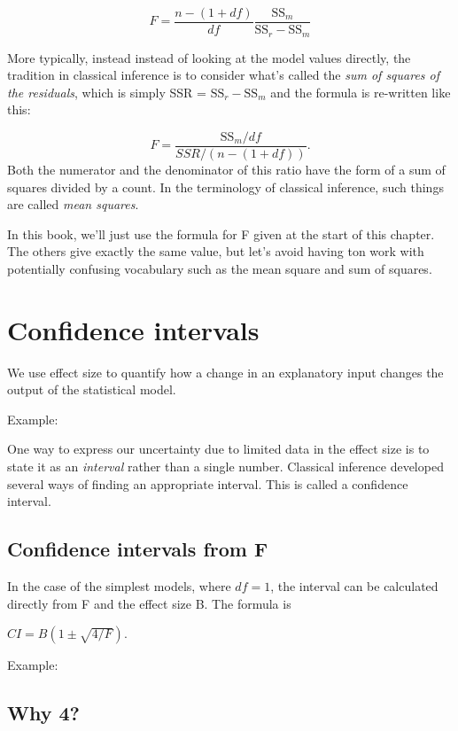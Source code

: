 \documentclass[]{tufte-book}
\begin{document}
\[F = \frac{n - (1+df)}{df} \frac{\mbox{SS}_m}{\mbox{SS}_r - \mbox{SS}_m}\]

More typically, instead instead of looking at the model values directly, the tradition in classical inference is to consider what's called the \emph{sum of squares of the residuals}, which is simply SSR = \(\mbox{SS}_r - \mbox{SS}_m\) and the formula is re-written like this:

\[F = \frac{\mbox{SS}_m / df}{SSR / (n -  (1+df))}.\]
Both the numerator and the denominator of this ratio have the form of a sum of squares divided by a count. In the terminology of classical inference, such things are called \emph{mean squares}.

In this book, we'll just use the formula for F given at the start of this chapter. The others give exactly the same value, but let's avoid having ton work with potentially confusing vocabulary such as the mean square and sum of squares.

\hypertarget{confidence-intervals}{%
\chapter{Confidence intervals}\label{confidence-intervals}}

We use effect size to quantify how a change in an explanatory input changes the output of the statistical model.

Example:

One way to express our uncertainty due to limited data in the effect size is to state it as an \emph{interval} rather than a single number. Classical inference developed several ways of finding an appropriate interval. This is called a confidence interval.

\hypertarget{confidence-intervals-from-f}{%
\section{Confidence intervals from F}\label{confidence-intervals-from-f}}

In the case of the simplest models, where \(df = 1\), the interval can be calculated directly from F and the effect size B. The formula is

\(CI = B (1 \pm \sqrt{4/F}).\)

Example:

\hypertarget{why-4}{%
\section{Why 4?}\label{why-4}}
\end{document}
